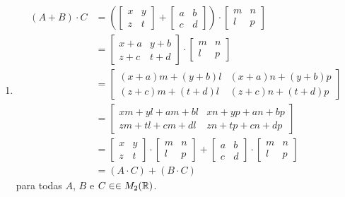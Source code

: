 \documentclass[12pt]{exam}
\begin{document}
\begin{enumerate}[label={\roman*})]
    \item
    \begin{align*}
        (A + B)\cdot C &= \left(\begin{bmatrix}
        x & y\\z & t 
    \end{bmatrix} + \begin{bmatrix}
        a & b\\c & d 
    \end{bmatrix}\right)\cdot \begin{bmatrix}
        m & n\\
        l & p
    \end{bmatrix}\\ &= \begin{bmatrix}
        x + a & y + b\\z + c & t + d 
    \end{bmatrix}\cdot \begin{bmatrix}
        m & n\\
        l & p
    \end{bmatrix}\\ &= \begin{bmatrix}
        (x + a)m + (y + b)l & (x + a)n + (y + b)p\\
        (z + c)m + (t + d)l & (z + c)n + (t + d)p
    \end{bmatrix}\\ &= \begin{bmatrix}
        xm + yl + am + bl & xn + yp + an + bp\\
        zm + tl + cm + dl & zn + tp + cn + dp
    \end{bmatrix}\\ &= \begin{bmatrix}
        x & y\\z & t 
    \end{bmatrix}\cdot \begin{bmatrix}
        m & n\\
        l & p
    \end{bmatrix} + \begin{bmatrix}
        a & b\\c & d 
    \end{bmatrix}\cdot \begin{bmatrix}
        m & n\\
        l & p
    \end{bmatrix}\\ &= (A\cdot C) + (B \cdot C)
    \end{align*}
    para todas $A$, $B$ e $C \in \in M_2(\mathbb{R})$.


\end{enumerate}
\end{document}
